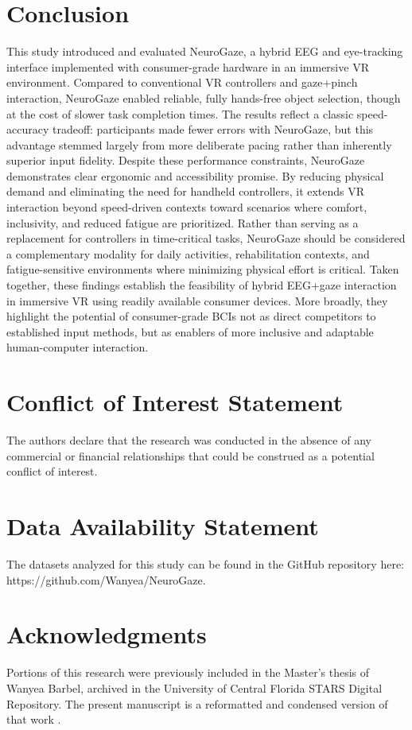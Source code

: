 \documentclass[utf8]{FrontiersinHarvard} %
\begin{document}
\section{Conclusion}
This study introduced and evaluated NeuroGaze, a hybrid EEG and eye-tracking interface implemented with consumer-grade hardware in an immersive VR environment. Compared to conventional VR controllers and gaze+pinch interaction, NeuroGaze enabled reliable, fully hands-free object selection, though at the cost of slower task completion times. The results reflect a classic speed-accuracy tradeoff: participants made fewer errors with NeuroGaze, but this advantage stemmed largely from more deliberate pacing rather than inherently superior input fidelity.
Despite these performance constraints, NeuroGaze demonstrates clear ergonomic and accessibility promise. By reducing physical demand and eliminating the need for handheld controllers, it extends VR interaction beyond speed-driven contexts toward scenarios where comfort, inclusivity, and reduced fatigue are prioritized. Rather than serving as a replacement for controllers in time-critical tasks, NeuroGaze should be considered a complementary modality for daily activities, rehabilitation contexts, and fatigue-sensitive environments where minimizing physical effort is critical.
Taken together, these findings establish the feasibility of hybrid EEG+gaze interaction in immersive VR using readily available consumer devices. More broadly, they highlight the potential of consumer-grade BCIs not as direct competitors to established input methods, but as enablers of more inclusive and adaptable human-computer interaction.


\section*{Conflict of Interest Statement}
The authors declare that the research was conducted in the absence of any commercial or financial relationships that could be construed as a potential conflict of interest.


\section*{Data Availability Statement}
The datasets analyzed for this study can be found in the GitHub repository here: https://github.com/Wanyea/NeuroGaze.

\section*{Acknowledgments}
Portions of this research were previously included in the Master's thesis of Wanyea Barbel, archived in the University of Central Florida STARS Digital Repository. The present manuscript is a reformatted and condensed version of that work \citep{Barbel2024}.
\end{document}
